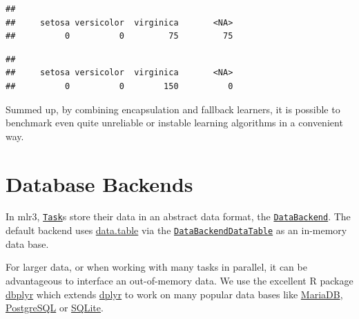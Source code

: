 \documentclass[]{scrbook}
\newenvironment{Shaded}{\begin{snugshade}}{\end{snugshade}}
\newcommand{\CommentTok}[1]{\textcolor[rgb]{0.56,0.35,0.01}{\textit{#1}}}
\newcommand{\DataTypeTok}[1]{\textcolor[rgb]{0.13,0.29,0.53}{#1}}
\newcommand{\KeywordTok}[1]{\textcolor[rgb]{0.13,0.29,0.53}{\textbf{#1}}}
\newcommand{\NormalTok}[1]{#1}
\newcommand{\OperatorTok}[1]{\textcolor[rgb]{0.81,0.36,0.00}{\textbf{#1}}}
\newcommand{\StringTok}[1]{\textcolor[rgb]{0.31,0.60,0.02}{#1}}
\renewenvironment{Shaded} {\begin{snugshade}\small} {\end{snugshade}}
\begin{document}
\begin{verbatim}
## 
##     setosa versicolor  virginica       <NA> 
##          0          0         75         75
\end{verbatim}

\begin{Shaded}
\end{Shaded}

\begin{verbatim}
## 
##     setosa versicolor  virginica       <NA> 
##          0          0        150          0
\end{verbatim}

Summed up, by combining encapsulation and fallback learners, it is possible to benchmark even quite unreliable or instable learning algorithms in a convenient way.

\hypertarget{backends}{%
\section{Database Backends}\label{backends}}

In mlr3, \href{https://mlr3.mlr-org.com/reference/Task.html}{\texttt{Task}}s store their data in an abstract data format, the \href{https://mlr3.mlr-org.com/reference/DataBackend.html}{\texttt{DataBackend}}.
The default backend uses \href{https://cran.r-project.org/package=data.table}{data.table} via the \href{https://mlr3.mlr-org.com/reference/DataBackendDataTable.html}{\texttt{DataBackendDataTable}} as an in-memory data base.

For larger data, or when working with many tasks in parallel, it can be advantageous to interface an out-of-memory data.
We use the excellent R package \href{https://cran.r-project.org/package=dbplyr}{dbplyr} which extends \href{https://cran.r-project.org/package=dplyr}{dplyr} to work on many popular data bases like \href{https://mariadb.org/}{MariaDB}, \href{https://www.postgresql.org/}{PostgreSQL} or \href{https://www.sqlite.org}{SQLite}.
\end{document}
